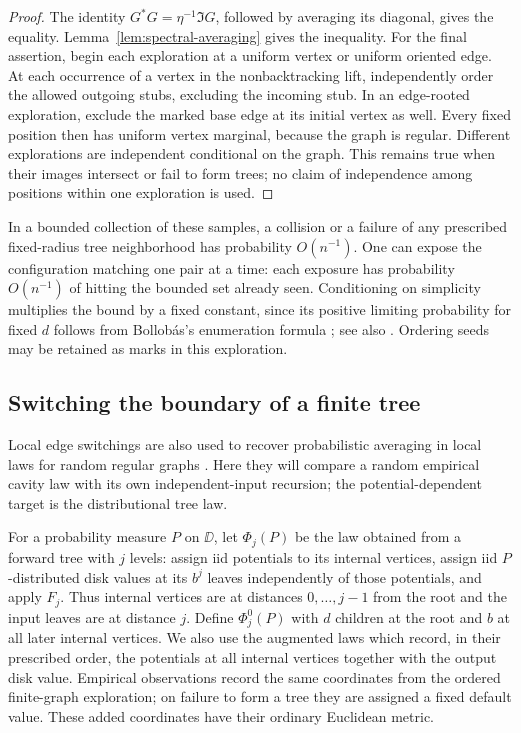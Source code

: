 \begin{proof}
The identity $G^*G=\eta^{-1}\Im G$, followed by averaging its diagonal,
gives the equality.  Lemma~\ref{lem:spectral-averaging} gives the inequality.
For the final assertion, begin each exploration at a uniform vertex or
uniform oriented edge.  At each occurrence of a vertex in the
nonbacktracking lift, independently order the allowed outgoing stubs,
excluding the incoming stub.  In an edge-rooted exploration, exclude the
marked base edge at its initial vertex as well.  Every fixed position
then has uniform vertex marginal, because the graph is regular.
Different explorations are independent conditional on the graph.
This remains true when their images intersect or fail to form trees;
no claim of independence among positions within one exploration is used.
\end{proof}

In a bounded collection of these samples, a collision or a failure of
any prescribed fixed-radius tree neighborhood has probability $O(n^{-1})$.
One can expose the configuration matching one pair at a time: each
exposure has probability $O(n^{-1})$ of hitting the bounded set already
seen.  Conditioning on simplicity multiplies the bound by a fixed
constant, since its positive limiting probability for fixed $d$ follows
from Bollob\'as's enumeration formula \cite{Bollobas1980}; see also
\cite[Lemma~2.1]{bu}.
Ordering seeds may be retained as marks in this exploration.

\subsection{Switching the boundary of a finite tree}

Local edge switchings are also used to recover probabilistic averaging
in local laws for random regular graphs
\cite{BKY2017Local,BHY2019Local}.  Here they will compare a random
empirical cavity law with its own independent-input recursion; the
potential-dependent target is the distributional tree law.

For a probability measure $P$ on $\DD$, let $\Phi_j(P)$ be the law
obtained from a forward tree with $j$ levels: assign iid potentials to
its internal vertices, assign iid $P$-distributed disk values at its
$b^j$ leaves independently of those potentials, and apply $F_j$.
Thus internal vertices are at distances $0,\ldots,j-1$ from the root
and the input leaves are at distance $j$.  Define $\Phi_j^0(P)$ with
$d$ children at the root and $b$ at all later internal vertices.
We also use the augmented laws which record, in their prescribed order,
the potentials at all internal vertices together with the output disk
value.  Empirical observations record the same coordinates from the
ordered finite-graph exploration; on failure to form a tree they are
assigned a fixed default value.  These added coordinates have their
ordinary Euclidean metric.

